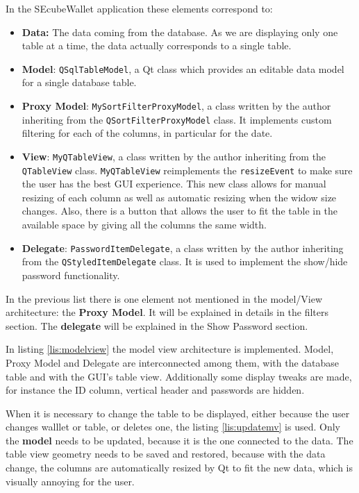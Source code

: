 In the SEcubeWallet application these elements correspond to:

\begin{itemize}
\setlength\itemsep{-3pt}

\item \textbf{Data:} The data coming from the database. As we are displaying only one table at a time, the data actually corresponds to a single table.
\item \textbf{Model}: \texttt{QSqlTableModel}, a Qt class which provides an editable data model for a single database table.
\item \textbf{Proxy Model}: \texttt{MySortFilterProxyModel}, a class written by the author inheriting from the \texttt{QSortFilterProxyModel} class. It implements custom filtering for each of the columns, in particular for the date.
\item \textbf{View}: \texttt{MyQTableView}, a class written by the author inheriting from the \texttt{QTableView} class. \texttt{MyQTableView} reimplements the \texttt{resizeEvent} to make sure the user has the best GUI experience. This new class allows for manual resizing of each column as well as automatic resizing when the widow size changes. Also, there is a button that allows the user to fit the table in the available space by giving all the columns the same width.
\item \textbf{Delegate}: \texttt{PasswordItemDelegate}, a class written by the author inheriting from the \texttt{QStyledItemDelegate} class. It is used to implement the show/hide password functionality.
\end{itemize}

In the previous list there is one element not mentioned in the model/View architecture: the \textbf{Proxy Model}. It will be explained in details in the filters section. The \textbf{delegate} will be explained in the Show Password section.

In listing \ref{lis:modelview} the model view architecture is implemented. Model, Proxy Model and Delegate are interconnected among them, with the database table and with the GUI's table view. Additionally some display tweaks are made, for instance the ID column, vertical header and passwords are hidden.



When it is necessary to change the table to be displayed, either because the user changes walllet or table, or deletes one, the listing \ref{lis:updatemv} is used. Only the \textbf{model} needs to be updated, because it is the one connected to the data. The table view geometry needs to be saved and restored, because with the data change, the columns are automatically resized by Qt to fit the new data, which is visually annoying for the user.

